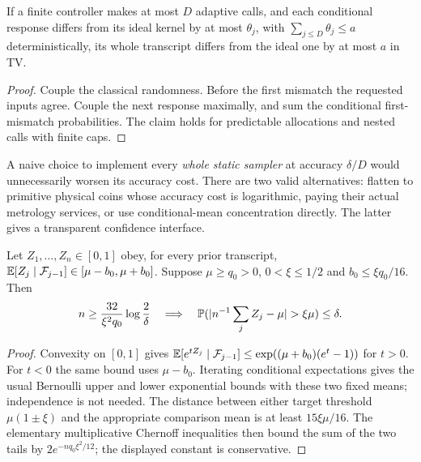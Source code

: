 \begin{lemma}\label{lem:rootAdaptive}
If a finite controller makes at most $D$ adaptive calls, and each
conditional response differs from its ideal kernel by at most
$\theta_j$, with $\sum_{j\le D}\theta_j\le a$ deterministically, its
whole transcript differs from the ideal one by at most $a$ in TV.
\end{lemma}
\begin{proof}
Couple the classical randomness. Before the first mismatch the requested
inputs agree. Couple the next response maximally, and sum the conditional
first-mismatch probabilities. The claim holds for predictable allocations
and nested calls with finite caps.
\end{proof}

A naive choice to implement every \emph{whole static sampler} at accuracy
$\delta/D$ would unnecessarily worsen its accuracy cost. There are two
valid alternatives: flatten to primitive physical coins whose accuracy
cost is logarithmic, paying their actual metrology services, or use
conditional-mean concentration directly. The latter gives a transparent
confidence interface.

\begin{lemma}\label{lem:rootChernoff}\label{lem:means}
Let $Z_1,\ldots,Z_n\in[0,1]$ obey, for every prior transcript,
$\mathbb E[Z_j\mid\mathcal F_{j-1}]\in[\mu-b_0,\mu+b_0]$.
Suppose $\mu\ge q_0>0$, $0<\xi\le1/2$ and
$b_0\le\xi q_0/16$. Then
\[
n\ge\frac{32}{\xi^2q_0}\log\frac2\delta
\quad\Longrightarrow\quad
\Prb(|n^{-1}\sum_j Z_j-\mu|>\xi\mu)\le\delta.
\]
\end{lemma}
\begin{proof}
Convexity on $[0,1]$ gives
$\mathbb E[e^{tZ_j}\mid\mathcal F_{j-1}]
\le\exp((\mu+b_0)(e^t-1))$ for $t>0$.
For $t<0$ the same bound uses $\mu-b_0$.
Iterating conditional expectations gives the usual Bernoulli upper and
lower exponential bounds with these two fixed means; independence is
not needed. The distance between either target threshold
$\mu(1\pm\xi)$ and the appropriate comparison mean is at least
$15\xi\mu/16$. The elementary multiplicative Chernoff inequalities
then bound the sum of the two tails by
$2e^{-nq_0\xi^2/12}$; the displayed constant is conservative.
\end{proof}


